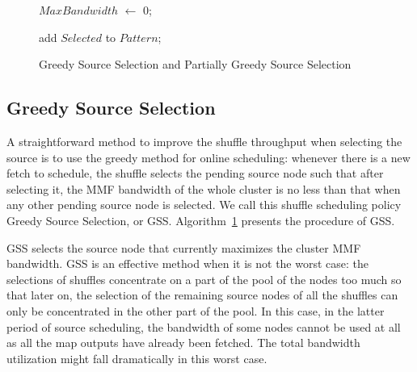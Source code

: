 \documentclass[10pt,journal,compsoc]{IEEEtran}
\makeatletter
\newcommand{\removelatexerror}{\let\@latex@error\@gobble}
\makeatother
\begin{document}
\begin{figure}[!t]
\removelatexerror
\begin{algorithm}[H]


  
 $MaxBandwidth$ $\gets$ 0;
 
add $Selected$ to $Pattern$;
\caption{Greedy Source Selection and Partially Greedy Source Selection}
\label{algo:PGSS}
\end{algorithm}
\end{figure}



\subsection{Greedy Source Selection}
A straightforward method to improve the shuffle throughput when
selecting the source is
to use the greedy method for online scheduling: 
whenever there is a new fetch to schedule, the shuffle selects the
pending source node such that after selecting it,
the MMF bandwidth of the whole cluster is no less
than that
when any other pending source node is selected. We call this shuffle
scheduling policy Greedy Source Selection, or GSS. 
Algorithm~\ref{algo:PGSS} presents the procedure of GSS.

GSS selects the source node that currently maximizes the cluster MMF bandwidth.
GSS is an effective method when it is not the
worst case:
the selections of shuffles concentrate on a part of the pool of the
nodes too much
so that later on, the selection of the remaining source nodes of all
the shuffles can only be concentrated in the other part of the pool.
In this case, in the latter period of source scheduling,
the bandwidth of some nodes cannot be used at all as all the map
outputs have already been fetched.
The total bandwidth utilization might fall dramatically in this worst case. 
\end{document}
